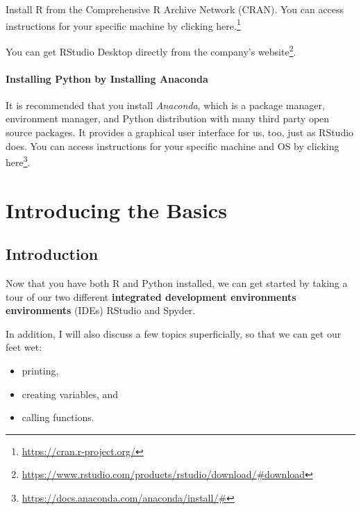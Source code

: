 \documentclass[12pt,krantz2]{krantz}
\providecommand{\tightlist}{%
  \setlength{\itemsep}{0pt}\setlength{\parskip}{0pt}}
\renewcommand{\href}[2]{#2\footnote{\url{#1}}}
\begin{document}
Install R from the Comprehensive R Archive Network (CRAN). You can access instructions for your specific machine by clicking \href{https://cran.r-project.org/}{here.}

You can get RStudio Desktop directly from the \href{https://www.rstudio.com/products/rstudio/download/\#download}{company's website}.

\hypertarget{installing-python-by-installing-anaconda}{%
\subsection*{Installing Python by Installing Anaconda}\label{installing-python-by-installing-anaconda}}


It is recommended that you install \emph{Anaconda}, which is a package manager, environment manager, and Python distribution with many third party open source packages. It provides a graphical user interface for us, too, just as RStudio does. You can access instructions for your specific machine and OS by clicking \href{https://docs.anaconda.com/anaconda/install/\#}{here}.

\mainmatter

\hypertarget{part-introducing-the-basics}{%
\part{Introducing the Basics}\label{part-introducing-the-basics}}

\hypertarget{intro}{%
\chapter{Introduction}\label{intro}}

Now that you have both R and Python installed, we can get started by taking a tour of our two different \textbf{integrated development environments environments} (IDEs) RStudio and Spyder.

In addition, I will also discuss a few topics superficially, so that we can get our feet wet:

\begin{itemize}
\tightlist
\item
  printing,
\item
  creating variables, and
\item
  calling functions.
\end{itemize}
\end{document}
